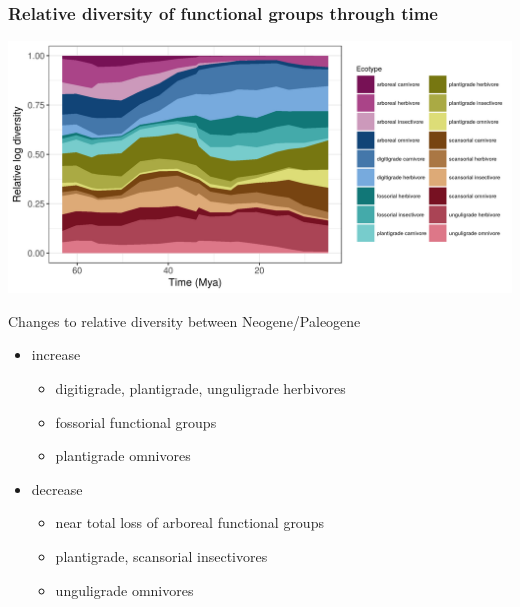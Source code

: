 \documentclass[aspectratio=169]{beamer}
\begin{document}
\begin{frame}
  \frametitle{Relative diversity of functional groups through time}
  \begin{center}
    \includegraphics[height=0.9\textheight,width=\textwidth,keepaspectratio=true]{figure/relative_diversity}
  \end{center}
\end{frame}

\begin{frame}
  \begin{block}{Changes to relative diversity between Neogene/Paleogene}
    \begin{itemize}
      \item \alert{increase}
        \begin{itemize}
          \item digitigrade, plantigrade, unguligrade herbivores
          \item fossorial functional groups
          \item plantigrade omnivores
        \end{itemize}
      \item \alert{decrease}
        \begin{itemize}
          \item near total loss of arboreal functional groups
          \item plantigrade, scansorial insectivores
          \item unguligrade omnivores
        \end{itemize}
    \end{itemize}
  \end{block}
\end{frame}
\end{document}
